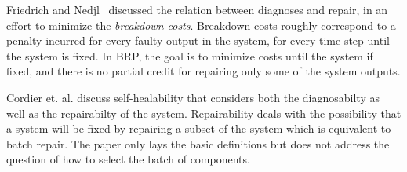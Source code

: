 \documentclass[review]{elsarticle}
\newcommand{\shortcite}{\cite}
\begin{document}

Friedrich and Nedjl~\shortcite{friedrich1992choosing} discussed the relation between diagnoses and repair, in an effort to minimize the {\em breakdown costs}. Breakdown costs roughly correspond to a penalty incurred for every faulty output in the system, for every time step until the system is fixed. In BRP, the goal is to minimize costs until the system if fixed, and there is no partial credit for repairing only some of the system outputs.

Cordier et. al. \shortcite{Cordier08} discuss self-healability that considers both the diagnosabilty as well as the repairabilty of the system. Repairability deals with the possibility that a system will be fixed by repairing a subset of the system which is equivalent to batch repair. The paper only lays the basic definitions but does not address the question of how to select the batch of components. 


\end{document}
